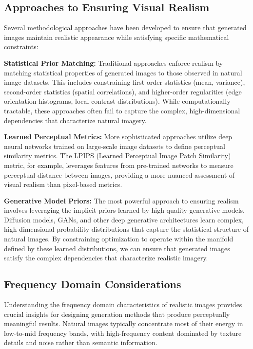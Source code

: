 \subsection{Approaches to Ensuring Visual Realism}

Several methodological approaches have been developed to ensure that generated images maintain realistic appearance while satisfying specific mathematical constraints:

\textbf{Statistical Prior Matching:} Traditional approaches enforce realism by matching statistical properties of generated images to those observed in natural image datasets. This includes constraining first-order statistics (mean, variance), second-order statistics (spatial correlations), and higher-order regularities (edge orientation histograms, local contrast distributions). While computationally tractable, these approaches often fail to capture the complex, high-dimensional dependencies that characterize natural imagery.

\textbf{Learned Perceptual Metrics:} More sophisticated approaches utilize deep neural networks trained on large-scale image datasets to define perceptual similarity metrics. The LPIPS (Learned Perceptual Image Patch Similarity) metric, for example, leverages features from pre-trained networks to measure perceptual distance between images, providing a more nuanced assessment of visual realism than pixel-based metrics.

\textbf{Generative Model Priors:} The most powerful approach to ensuring realism involves leveraging the implicit priors learned by high-quality generative models. Diffusion models, GANs, and other deep generative architectures learn complex, high-dimensional probability distributions that capture the statistical structure of natural images. By constraining optimization to operate within the manifold defined by these learned distributions, we can ensure that generated images satisfy the complex dependencies that characterize realistic imagery.

\subsection{Frequency Domain Considerations}

Understanding the frequency domain characteristics of realistic images provides crucial insights for designing generation methods that produce perceptually meaningful results. Natural images typically concentrate most of their energy in low-to-mid frequency bands, with high-frequency content dominated by texture details and noise rather than semantic information.

